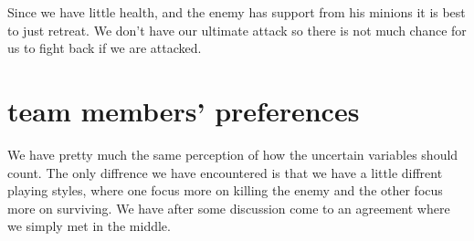 \documentclass[titlepage]{article}
\begin{document}
Since we have little health, and the enemy has support from his minions it is best to just retreat. We don't have our ultimate attack so there is not much chance for us to fight back if we are attacked. 

\section{team members' preferences}
We have pretty much the same perception of how the uncertain variables should count. The only diffrence we have encountered is that we have a little diffrent playing styles, where one focus more on killing the enemy and the other focus more on surviving. We have after some discussion come to an agreement where we simply met in the middle.  
\end{document}

